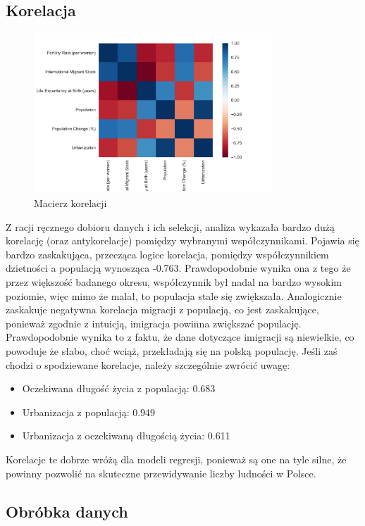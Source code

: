 \documentclass[11pt]{article}
\begin{document}
\subsection*{Korelacja}
\begin{figure}[H]
        \centering
        \includegraphics[width=0.8\textwidth]{images/matryca_korelacji.png}
        \caption{Macierz korelacji}
\end{figure}
        Z racji ręcznego dobioru danych i ich selekcji, analiza wykazała bardzo dużą korelację (oraz antykorelacje) pomiędzy wybranymi współczynnikami.
        Pojawia się bardzo zaskakująca, przecząca logice korelacja, pomiędzy współczynnikiem dzietności a populacją wynosząca -0.763.
        Prawdopodobnie wynika ona z tego że przez większość badanego okresu, współczynnik był nadal na bardzo wysokim poziomie, więc mimo że malał, to populacja stale się zwiększała.
        Analogicznie zaskakuje negatywna korelacja migracji z populacją, co jest zaskakujące, ponieważ zgodnie z intuicją, imigracja powinna zwiększać populację.
        Prawdopodobnie wynika to z faktu, że dane dotyczące imigracji są niewielkie, co powoduje że słabo, choć wciąż, przekładają się na polską populację.
        Jeśli zaś chodzi o spodziewane korelacje, należy szczególnie zwrócić uwagę:
        \begin{itemize}
        \item Oczekiwana długość życia z populacją: 0.683
        \item Urbanizacja z populacją: 0.949
        \item Urbanizacja z oczekiwaną długością życia: 0.611
        \end{itemize}
        Korelacje te dobrze wróżą dla modeli regresji, ponieważ są one na tyle silne, że powinny pozwolić na skuteczne przewidywanie liczby ludności w Polsce.
\subsection*{Obróbka danych}
\end{document}
